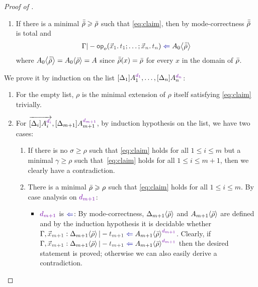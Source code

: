 \begin{proof}[Proof of {}]
\begin{itemize}
\begin{itemize}
\begin{enumerate}
\begin{enumerate}
                \item If there is a minimal $\bar{\bar{\rho}} \geqslant \bar{\rho}$ such that \eqref{eq:claim}, then by mode-correctness $\bar{\bar{\rho}}$ is total and
                  \[
                    \Gamma |- \tmOpts \chk \simsub{A_0}{\ext{\ext{\rho}}}
                  \]
                  where ${A_0}\!\left<{\bar{\bar{\rho}}}\right> = {A_0}\!\left<{\bar{\rho}}\right> = A$ since $\bar{\bar{\rho}}(x) = \bar{\rho}$ for every $x$ in the domain of $\bar{\rho}$.
              \end{enumerate}
          \end{enumerate}
      \end{itemize}
      \begin{claimproof}
        We prove it by induction on the list $\biargs$:
        \begin{enumerate}
          \item For the empty list, $\rho$ is the minimal extension of $\rho$ itself satisfying \eqref{eq:claim} trivially. 
          \item For $\biargvec, \biarg[m+1]$, by induction hypothesis on the list, we have two cases:
            \begin{enumerate}
              \item If there is no $\sigma \geq \rho$ such that \eqref{eq:claim} holds for all $1 \leq i \leq m$ but a minimal $\gamma \geq \rho$ such that~\eqref{eq:claim} holds for all $1 \leq i \leq m + 1$, then we clearly have a contradiction.
              \item There is a minimal $\bar{\rho} \geqslant \rho$ such that \eqref{eq:claim} holds for all $1 \leq i \leq m$.
                By case analysis on $\dir{d_{m+1}}$:
                \begin{itemize}
                  \item $\dir{d_{m+1}}$ is $\chk$: By mode-correctness, ${\Delta_{m+1}}\!\left<{\bar{\rho}}\right>$ and ${A_{m+1}}\!\left<{\bar{\rho}}\right>$ are defined and by the induction hypothesis it is decidable whether $\Gamma, \vars{x}_\isTerm{m+1} : \simsub{\Delta_{m+1}}{\ext{\rho}} |- \isTerm{t_{m+1}} \chk \simsub{A_{m+1}}{\ext{\rho}}^{\dir{d_{m+1}}}$.
                    Clearly, if $\Gamma, \vars{x}_\isTerm{m+1} : \simsub{\Delta_{m+1}}{\ext{\rho}} |- \isTerm{t_{m+1}} \chk \simsub{A_{m+1}}{\ext{\rho}}^{\dir{d_{m+1}}}$ then the desired statement is proved; otherwise we can also easily derive a contradiction.


\end{itemize}
\end{enumerate}
\end{enumerate}
\end{claimproof}
\end{itemize}
\end{proof}
